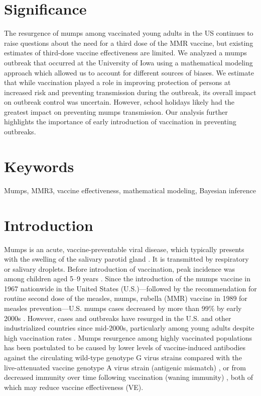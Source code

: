\documentclass[12pt]{article}
\begin{document}
\section*{Significance}
The resurgence of mumps among vaccinated young adults in the US continues to raise questions about the need for a third dose of the MMR vaccine, but existing estimates of third-dose vaccine effectiveness are limited.
We analyzed a mumps outbreak that occurred at the University of Iowa using a mathematical modeling approach which allowed us to account for different sources of biases. 
We estimate that while vaccination played a role in improving protection of persons at increased risk and preventing transmission during the outbreak, its overall impact on outbreak control was uncertain. 
However, school holidays likely had the greatest impact on preventing mumps transmission. 
Our analysis further highlights the importance of early introduction of vaccination in preventing outbreaks.

\section*{Keywords}
Mumps, MMR3, vaccine effectiveness, mathematical modeling, Bayesian inference

\pagebreak

\section{Introduction}

Mumps is an acute, vaccine-preventable viral disease, which typically presents with the swelling of the salivary parotid gland \citep{hviid2008mumps}.
It is transmitted by respiratory or salivary droplets.
Before introduction of vaccination, peak incidence was among children aged 5–9 years \citep{galazka1999mumps}.
Since the introduction of the mumps vaccine in 1967 nationwide in the United States (U.S.)---followed by the recommendation for routine second dose of the measles, mumps, rubella (MMR) vaccine in 1989 for measles prevention---U.S. mumps cases decreased by more than 99\% by early 2000s \citep{mclean2013prevention}.
However, cases and outbreaks have resurged in the U.S. \citep{ogbuanu2012impact,nelson2013epidemiology,cardemil2017effectiveness,wohl2020combining,lo2021influenza} and other industrialized countries since mid-2000s, particularly among young adults despite high vaccination rates \citep{aasheim2014outbreak,vygen2016waning}.
Mumps resurgence among highly vaccinated populations has been postulated to be caused by lower levels of vaccine-induced antibodies against the circulating wild-type genotype G virus strains compared with the live-attenuated vaccine genotype A virus strain (antigenic mismatch) \citep{peltola2007mumps,rubin2008antibody}, or from decreased immunity over time following vaccination (waning immunity) \citep{lewnard2018vaccine,seagle2018measles,gokhale2023disentangling}, both of which may reduce vaccine effectiveness (VE).
\end{document}
